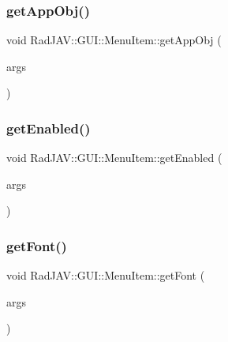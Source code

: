 \subsubsection{\texorpdfstring{get\+App\+Obj()}{getAppObj()}}
{\footnotesize\ttfamily void Rad\+J\+A\+V\+::\+G\+U\+I\+::\+Menu\+Item\+::get\+App\+Obj (\begin{DoxyParamCaption}\item[{const v8\+::\+Function\+Callback\+Info$<$ v8\+::\+Value $>$ \&}]{args }\end{DoxyParamCaption})\hspace{0.3cm}{\ttfamily [static]}}

\mbox{\label{class_rad_j_a_v_1_1_g_u_i_1_1_menu_item_ab54be9464064c18dea31100c0266c633}} 
\subsubsection{\texorpdfstring{get\+Enabled()}{getEnabled()}}
{\footnotesize\ttfamily void Rad\+J\+A\+V\+::\+G\+U\+I\+::\+Menu\+Item\+::get\+Enabled (\begin{DoxyParamCaption}\item[{const v8\+::\+Function\+Callback\+Info$<$ v8\+::\+Value $>$ \&}]{args }\end{DoxyParamCaption})\hspace{0.3cm}{\ttfamily [static]}}

\mbox{\label{class_rad_j_a_v_1_1_g_u_i_1_1_menu_item_a11c5458b3e94a6eabe4c4b60f021540a}} 
\subsubsection{\texorpdfstring{get\+Font()}{getFont()}}
{\footnotesize\ttfamily void Rad\+J\+A\+V\+::\+G\+U\+I\+::\+Menu\+Item\+::get\+Font (\begin{DoxyParamCaption}\item[{const v8\+::\+Function\+Callback\+Info$<$ v8\+::\+Value $>$ \&}]{args }\end{DoxyParamCaption})\hspace{0.3cm}{\ttfamily [static]}}

